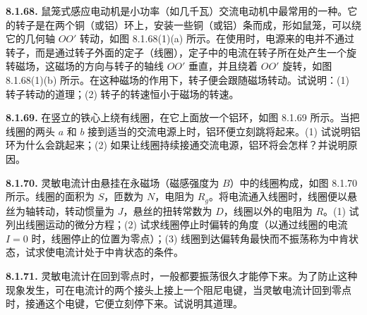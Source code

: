 \vfill
\newpage

\textbf{8.1.68.} 鼠笼式感应电动机是小功率（如几千瓦）交流电动机中最常用的一种。它的转子是在两个铜（或铝）环上，安装一些铜（或铝）条而成，形如鼠笼，可以绕它的几何轴 $OO'$ 转动，如图 8.1.68(1)(a) 所示。在使用时，电源来的电并不通过转子，而是通过转子外面的定子（线圈），定子中的电流在转子所在处产生一个旋转磁场，这磁场的方向与转子的轴线 $OO'$ 垂直，并且绕着 $OO'$ 旋转，如图 8.1.68(1)(b) 所示。在这种磁场的作用下，转子便会跟随磁场转动。试说明：(1) 转子转动的道理；(2) 转子的转速恒小于磁场的转速。

\begin{center}
  \begin{minipage}[b]{0.47\linewidth}
    \centering
  \end{minipage}\hfill
  \begin{minipage}[b]{0.47\linewidth}
    \centering
  \end{minipage}
\end{center}

\vfill
\newpage

\textbf{8.1.69.} 在竖立的铁心上绕有线圈，在它上面放一个铝环，如图 8.1.69 所示。当把线圈的两头 $a$ 和 $b$ 接到适当的交流电源上时，铝环便立刻跳将起来。(1) 试说明铝环为什么会跳起来；(2) 如果让线圈持续接通交流电源，铝环将会怎样？并说明原因。

\begin{center}
\end{center}

\vfill
\newpage

\textbf{8.1.70.} 灵敏电流计由悬挂在永磁场（磁感强度为 $B$）中的线圈构成，如图 8.1.70 所示。线圈的面积为 $S$，匝数为 $N$，电阻为 $R_{g}$。将电流通入线圈时，线圈便以悬丝为轴转动，转动惯量为 $J$，悬丝的扭转常数为 $D$，线圈以外的电阻为 $R$。(1) 试列出线圈运动的微分方程；(2) 试求线圈停止时偏转的角度（以通过线圈的电流 $I = 0$ 时，线圈停止的位置为零点）；(3) 线圈到达偏转角最快而不振荡称为中肯状态，试求使电流计处于中肯状态的条件。

\begin{center}
\end{center}

\vfill
\newpage

\textbf{8.1.71.} 灵敏电流计在回到零点时，一般都要振荡很久才能停下来。为了防止这种现象发生，可在电流计的两个接头上接上一个阻尼电键，当灵敏电流计回到零点时，接通这个电键，它便立刻停下来。试说明其道理。

